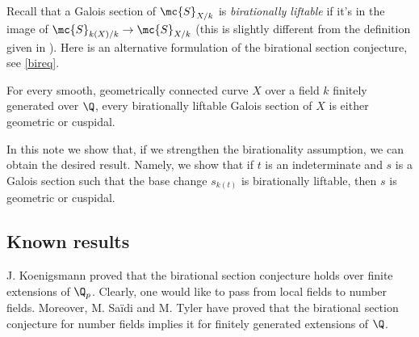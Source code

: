 Recall that a Galois section of $\mc{S}_{X/k}$ is \emph{birationally liftable} if it's in the image of $\mc{S}_{k(X)/k}\to\mc{S}_{X/k}$ \cite[\S 2.1.1]{sti15} (this is slightly different from the definition given in \cite[Definition 266]{sti13}). Here is an alternative formulation of the birational section conjecture, see \autoref{bireq}.


\begin{BSC2}
\notready
    For every smooth, geometrically connected curve $X$ over a field $k$ finitely generated over $\Q$, every birationally liftable Galois section of $X$ is either geometric or cuspidal.
\end{BSC2}



In this note we show that, if we strengthen the birationality assumption, we can obtain the desired result. Namely, we show that if $t$ is an indeterminate and $s$ is a Galois section such that the base change $s_{k(t)}$ is birationally liftable, then $s$ is geometric or cuspidal.

\subsection{Known results}

J. Koenigsmann \cite{koe05} proved that the birational section conjecture holds over finite extensions of $\Q_{p}$. Clearly, one would like to pass from local fields to number fields. Moreover, M. Sa\"idi and M. Tyler \cite{saty21} have proved that the birational section conjecture for number fields implies it for finitely generated extensions of $\Q$.

